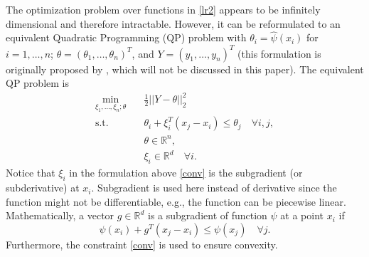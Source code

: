 \documentclass{article}
\begin{document}
The optimization problem over functions in \eqref{lr2} appears to be infinitely dimensional and therefore intractable. However, it can be reformulated to an equivalent Quadratic Programming (QP) problem with $\theta_i = \hat{\psi}(x_i)$ for $i=1,\dots,n$; $\theta=(\theta_1,\dots,\theta_n)^T$, and $Y=(y_1,\dots,y_n)^T$ (this formulation is originally proposed by \cite{Seijo11}, which will not be discussed in this paper). The equivalent QP problem is
\begin{align}  \label{lr3}
    \min_{\xi_1,\dots,\xi_n;\theta} \quad &\frac{1}{2}||Y-\theta||_2^2 \\
    \label{conv}
    \textrm{s.t.} \quad\quad  &\theta_i+\xi_i^T(x_j-x_i) \leq \theta_j \quad \forall i,j, \\
    &\theta \in \mathbb{R}^n, \\
    &\xi_i \in \mathbb{R}^d \quad \forall i.
\end{align}
Notice that $\xi_i$ in the formulation above \eqref{conv} is the subgradient (or subderivative) at $x_i$. Subgradient is used here instead of derivative since the function might not be differentiable, e.g., the function can be piecewise linear. Mathematically, a vector $g \in \mathbb{R}^d$ is a subgradient of function $\psi$ at a point $x_i$ if
\begin{equation} \label{subgradient}
    \psi(x_i)+g^T(x_j-x_i) \leq \psi(x_j) \quad \forall j.
\end{equation}
Furthermore, the constraint \eqref{conv} is used to ensure convexity.
\end{document}
